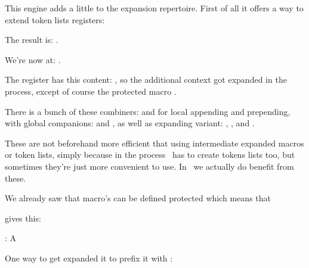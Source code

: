 This engine adds a little to the expansion repertoire. First of all it offers a
way to extend token lists registers:

\startbuffer
\def\MyMacroA{a}
\def\MyMacroB{b}
\normalprotected{}
\scratchtoks{\MyMacroA\MyMacroB}
\stopbuffer

\typebuffer[option=TEX] \getbuffer

The result is: \MyShow.

\startbuffer
\toksapp\scratchtoks{\MyMacroA\MyMacroB}
\stopbuffer

\typebuffer[option=TEX] \getbuffer

We're now at: \MyShow.

\startbuffer
\etoksapp\scratchtoks{\MyMacroA\space\MyMacroB\space\MyMacroC}
\stopbuffer

\typebuffer[option=TEX] \getbuffer

The register has this content: \MyShow, so the additional context got expanded in
the process, except of course the protected macro \type {\MyMacroC}.

There is a bunch of these combiners: \type {\toksapp} and \type {\tokspre} for
local appending and prepending, with global companions: \type {\gtoksapp} and
\type {\gtokspre}, as well as expanding variant: \type {\etoksapp}, \type
{\etokspre}, \type {\xtoksapp} and \type {\xtokspre}.

These are not beforehand more efficient that using intermediate expanded macros
or token lists, simply because in the process \TEX\ has to create tokens lists
too, but sometimes they're just more convenient to use. In \CONTEXT\ we actually
do benefit from these.

\stopsection

\startsection[title={\LUAMETATEX\ primitives}]

We already saw that macro's can be defined protected which means that

\startbuffer
           \def\TestA{A}
\protected {}
          \edef\TestC{\TestA\TestB}
\stopbuffer

\typebuffer[option=TEX] \getbuffer

gives this:

\startlines
\type{\TestC} : {\tttf \meaningless\TestC}
\stoplines

One way to get \type {\TestB} expanded it to prefix it with \type {\expand}:

\startbuffer
           \def\TestA{A}
\protected {}
          \edef\TestC{\TestA\TestB}
          \edef\TestD{\TestA\expand\TestB}
\stopbuffer

